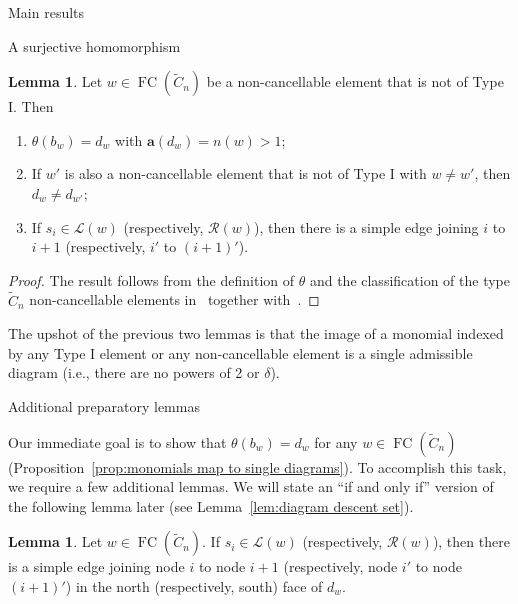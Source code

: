 \documentclass[11pt]{amsart}
\theoremstyle{definition}
\newtheorem{lemma}[theorem]{Lemma}
\numberwithin{equation}{section}
\newcommand{\C}{\widetilde{C}}
\renewcommand{\a}{\mathbf{a}}
\renewcommand{\L}{\mathcal{L}}
\newcommand{\R}{\mathcal{R}}
\renewcommand{\(}{\left(}
\renewcommand{\)}{\right)}
\DeclareMathOperator{\FC}{FC}
\begin{document}
\begin{section}{Main results}
\begin{subsection}{A surjective homomorphism}
\begin{lemma}\label{lem:image wsrm}
Let $w\in \FC(\C_{n})$ be a non-cancellable element that is not of Type I.  Then 
\begin{enumerate}[label=\rm{(\arabic*)}]
\item $\theta(b_{w})=d_{w}$ with $\a(d_{w})=n(w)>1$;
\item If $w'$ is also a non-cancellable element that is not of Type I with $w \neq w'$, then $d_{w} \neq d_{w'}$;
\item If $s_{i} \in \L(w)$ (respectively, $\R(w)$), then there is a simple edge joining $i$ to $i+1$ (respectively, $i'$ to $(i+1)'$).
\end{enumerate}
\end{lemma}

\begin{proof}
The result follows from the definition of $\theta$ and the classification of the type $\C_n$ non-cancellable elements in~\cite[Theorem 5.1.1]{Ernst2010} together with~\cite[Proposition 3.1.3]{Ernst2010}.
\end{proof}

The upshot of the previous two lemmas is that the image of a monomial indexed by any Type I element or any non-cancellable element is a single admissible diagram (i.e., there are no powers of 2 or $\delta$). 

\end{subsection}


\begin{subsection}{Additional preparatory lemmas}\label{subsec:additional prep lemmas}

Our immediate goal is to show that $\theta(b_{w})=d_{w}$ for any $w \in \FC(\C_{n})$ (Proposition~\ref{prop:monomials map to single diagrams}).  To accomplish this task, we require a few additional lemmas.  We will state an ``if and only if'' version of the following lemma later (see Lemma~\ref{lem:diagram descent set}).

\begin{lemma}\label{lem:simple edge in N face}
Let $w \in \FC(\C_{n})$.  If $s_{i} \in \L(w)$ (respectively, $\R(w)$), then there is a simple edge joining node $i$ to node $i+1$ (respectively, node $i'$ to node $(i+1)'$) in the north (respectively, south) face of $d_{w}$.
\end{lemma} 


\end{subsection}
\end{section}
\end{document}
